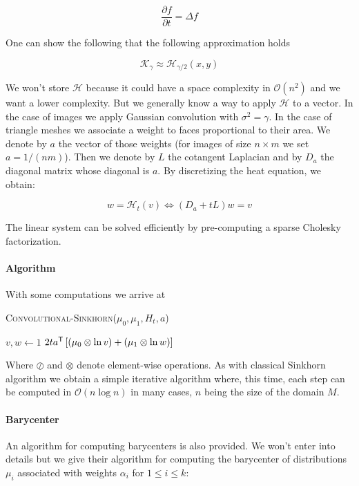 $$
    \dfrac{\partial f}{\partial t} = \Delta f
$$

One can show the following that the following approximation holds

$$ \mathcal{K}_\gamma \approx \mathcal{H}_{\gamma / 2}(x, y) $$

We won't store $\mathcal{H}$ because it could have a space complexity in
$\mathcal{O}(n^2)$ and we want a lower complexity. But we generally know
a way to apply $\mathcal{H}$ to a vector. In the case of images we apply
Gaussian convolution with $\sigma^2 = \gamma$. In the case of triangle meshes
we associate a weight to faces proportional to their area. We denote by $a$
the vector of those weights (for images of size $n \times m$ we set $a = 1 /
(nm)$). Then we denote by $L$ the cotangent Laplacian and by $D_a$ the diagonal
matrix whose diagonal is $a$. By discretizing the heat equation, we obtain:

$$
    w = \mathcal{H}_t(v) \Leftrightarrow \left( D_a + t L \right) w = v
$$

The linear system can be solved efficiently by pre-computing a sparse
Cholesky factorization.

\paragraph{Algorithm}
With some computations we arrive at

\vspace{3mm}
\begin{algorithm}[H]
	\caption{\textsc{Convolutional-Sinkhorn}($\mu_0, \mu_1, H_t, a$)}
	$v, w \gets 1$ \;
	\Return $2t a^{\mathsf{T}} \left[ \left( \mu_0 \otimes \ln v \right) + \left( \mu_1 \otimes \ln w \right) \right]$
\end{algorithm}
\vspace{3mm}

Where $\oslash$ and $\otimes$ denote element-wise operations. As with classical
Sinkhorn algorithm we obtain a simple iterative algorithm where, this time,
each step can be computed in $\mathcal{O}(n \log n)$ in many cases, $n$
being the size of the domain $M$.

\paragraph{Barycenter}
An algorithm for computing barycenters is also provided. We won't enter
into details but we give their algorithm for computing the barycenter of
distributions $\mu_i$ associated with weights $\alpha_i$ for $1 \leqslant
i \leqslant k$:

